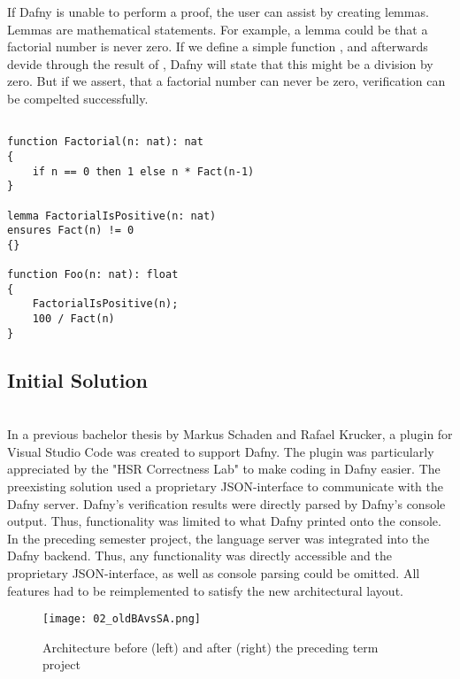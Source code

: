 If Dafny is unable to perform a proof, the user can assist by creating lemmas. Lemmas are mathematical statements. For example, a lemma could be that a factorial number is never zero. If we define a simple function , and afterwards devide through the result of , Dafny will state that this might be a division by zero. But if we assert, that a factorial number can never be zero, verification can be compelted successfully.
\begin{lstlisting}[language=dafny, caption={Lemmas}, captionpos=b, label={lst:lemma}]

function Factorial(n: nat): nat
{
    if n == 0 then 1 else n * Fact(n-1)
}

lemma FactorialIsPositive(n: nat)
ensures Fact(n) != 0
{}

function Foo(n: nat): float
{
    FactorialIsPositive(n);
    100 / Fact(n)
}
\end{lstlisting}

\subsection{Initial Solution}
\\
\label{section:introduction:initialsolution}
In a previous bachelor thesis by Markus Schaden and Rafael Krucker, a plugin for Visual Studio Code
was created to support Dafny.\cite{ba} The plugin was particularly appreciated by the "HSR Correctness Lab"\cite{correctnessLab} to make coding in Dafny easier. The preexisting solution used a proprietary JSON-interface to communicate with the Dafny server. Dafny's verification results were directly parsed by Dafny's console output. Thus, functionality was limited to what Dafny printed onto the console.\\
In the preceding semester project\cite{sa}, the language server was integrated into the Dafny backend. Thus, any functionality was directly accessible and the proprietary JSON-interface, as well as console parsing could be omitted. All features had to be reimplemented to satisfy the new architectural layout.

\begin{figure}[h]
    \centering
    \texttt{[image: 02\_oldBAvsSA.png]}
    \caption{Architecture before (left) and after (right) the preceding term project}
    \label{fig:oldBAvsSA}
\end{figure}

